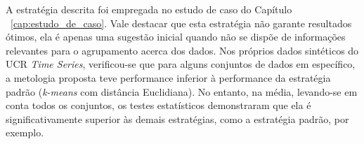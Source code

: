 A estratégia descrita foi empregada no estudo de caso do Capítulo ~\ref{cap:estudo_de_caso}. Vale destacar que esta estratégia não garante resultados ótimos, ela é apenas uma sugestão inicial quando não se dispõe de informações relevantes para o agrupamento acerca dos dados. Nos próprios dados sintéticos do UCR \emph{Time Series}, verificou-se que para alguns conjuntos de dados em específico, a metologia proposta teve performance inferior à performance da estratégia padrão (\emph{k-means} com distância Euclidiana). No entanto, na média, levando-se em conta todos os conjuntos, os testes estatísticos demonstraram que ela é significativamente superior às demais estratégias, como a estratégia padrão, por exemplo.









